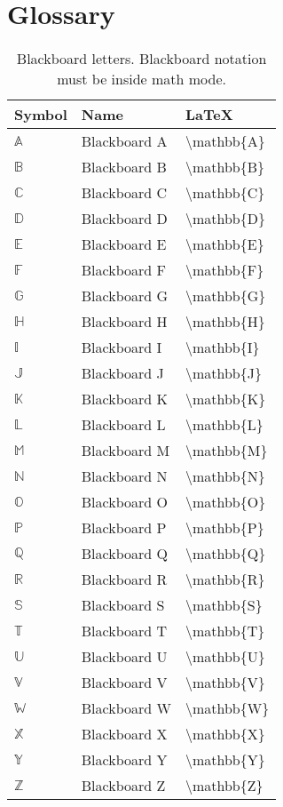 \chapter{Glossary}
\label{chap:Glossary}

\begin{table}[!htb]
\begin{tabularx}{\linewidth}{ l l X } \hline
  Symbol & Name & \LaTeX \\
  \hline
  $\mathbb{A}$ & Blackboard A & \textbackslash mathbb\{A\} \\
  $\mathbb{B}$ & Blackboard B & \textbackslash mathbb\{B\} \\
  $\mathbb{C}$ & Blackboard C & \textbackslash mathbb\{C\} \\
  $\mathbb{D}$ & Blackboard D & \textbackslash mathbb\{D\} \\
  $\mathbb{E}$ & Blackboard E & \textbackslash mathbb\{E\} \\
  $\mathbb{F}$ & Blackboard F & \textbackslash mathbb\{F\} \\
  $\mathbb{G}$ & Blackboard G & \textbackslash mathbb\{G\} \\
  $\mathbb{H}$ & Blackboard H & \textbackslash mathbb\{H\} \\
  $\mathbb{I}$ & Blackboard I & \textbackslash mathbb\{I\} \\
  $\mathbb{J}$ & Blackboard J & \textbackslash mathbb\{J\} \\
  $\mathbb{K}$ & Blackboard K & \textbackslash mathbb\{K\} \\
  $\mathbb{L}$ & Blackboard L & \textbackslash mathbb\{L\} \\
  $\mathbb{M}$ & Blackboard M & \textbackslash mathbb\{M\} \\
  $\mathbb{N}$ & Blackboard N & \textbackslash mathbb\{N\} \\
  $\mathbb{O}$ & Blackboard O & \textbackslash mathbb\{O\} \\
  $\mathbb{P}$ & Blackboard P & \textbackslash mathbb\{P\} \\
  $\mathbb{Q}$ & Blackboard Q & \textbackslash mathbb\{Q\} \\
  $\mathbb{R}$ & Blackboard R & \textbackslash mathbb\{R\} \\
  $\mathbb{S}$ & Blackboard S & \textbackslash mathbb\{S\} \\
  $\mathbb{T}$ & Blackboard T & \textbackslash mathbb\{T\} \\
  $\mathbb{U}$ & Blackboard U & \textbackslash mathbb\{U\} \\
  $\mathbb{V}$ & Blackboard V & \textbackslash mathbb\{V\} \\
  $\mathbb{W}$ & Blackboard W & \textbackslash mathbb\{W\} \\
  $\mathbb{X}$ & Blackboard X & \textbackslash mathbb\{X\} \\
  $\mathbb{Y}$ & Blackboard Y & \textbackslash mathbb\{Y\} \\
  $\mathbb{Z}$ & Blackboard Z & \textbackslash mathbb\{Z\}
\end{tabularx}
\caption{Blackboard letters. Blackboard notation must be inside math mode.}
\label{tab:BlackboardLetters}
\end{table}

